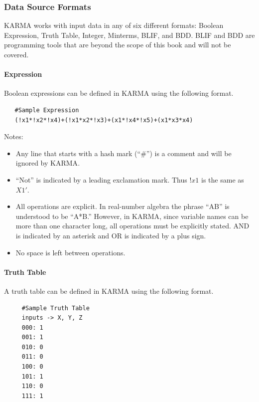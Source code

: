 \subsubsection{Data Source Formats}
\label{ASM:subsubsec:karma_data_source_formats}

\ac{KARMA} works with input data in any of six different formats: Boolean Expression, Truth Table, Integer, Minterms, \ac{BLIF}, and \ac{BDD}. \ac{BLIF} and \ac{BDD} are programming tools that are beyond the scope of this book and will not be covered. 


\paragraph{Expression}
\label{ASM:para:karma_expression}

Boolean expressions can be defined in \ac{KARMA} using the following format.

{\small 
	\begin{verbatim}
   #Sample Expression
   (!x1*!x2*!x4)+(!x1*x2*!x3)+(x1*!x4*!x5)+(x1*x3*x4) 
	\end{verbatim}
}

Notes:

\begin{itemize}
	\item Any line that starts with a hash mark (``\#'') is a comment and will be ignored by \ac{KARMA}. 
	\item ``Not'' is indicated by a leading exclamation mark. Thus $ !x1 $ is the same as $ X1' $. 
	\item All operations are explicit. In real-number algebra the phrase ``AB'' is understood to be ``A*B.'' However, in \ac{KARMA}, since variable names can be more than one character long, all operations must be explicitly stated. \textsf{AND} is indicated by an asterisk and \textsf{OR} is indicated by a plus sign. 
	\item No space is left between operations. 
\end{itemize}

\paragraph{Truth Table}
\label{ASM:para:karma_truth_table}

A truth table can be defined in \ac{KARMA} using the following format.

\begin{verbatim}
     #Sample Truth Table
     inputs -> X, Y, Z
     000: 1
     001: 1
     010: 0
     011: 0
     100: 0
     101: 1
     110: 0
     111: 1 
\end{verbatim}

